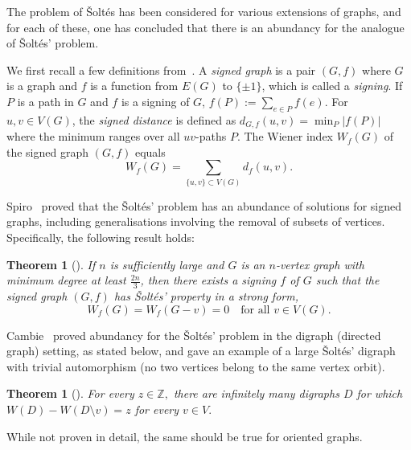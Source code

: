 \documentclass[a4paper,11pt]{article}
\newcommand*{\abs}[1]{\lvert #1\rvert}
\newtheorem{thm}[defi]{Theorem}
\begin{document}

    

    The problem of \v Solt\'es has been considered for various extensions of graphs, and for each of these, one has concluded that there is an abundancy for the analogue of \v Solt\'es' problem.

    We first recall a few definitions from~\cite{Spiro22}.
    A \emph{signed graph} is a pair \((G, f)\) where \(G\) is a graph and \(f\) is a function from \(E(G)\) to \(\{ \pm 1 \}\), which is called a \emph{signing}.
If \( P \) is a path in \( G \) and \(f \) is a signing of \( G \), 
\(
f(P) := \sum_{e \in P} f(e).
\)
For \( u, v \in V(G) \), the \emph{signed distance} is defined as
$
d_{G,f}(u,v) = \min_P \abs{f(P)}$
where the minimum ranges over all \( uv \)-paths \( P \).
The Wiener index \( W_f(G) \) of the signed graph \( (G, f) \) equals
\[
W_f(G) =  \sum_{\{u,v\} \subset V(G)} d_f(u,v).
\]

Spiro~\cite[Cor.~1.2]{Spiro22} proved that the \v Solt\'es' problem has an abundance of solutions for signed graphs, including generalisations involving the removal of subsets of vertices. Specifically, the following result holds: 
\begin{thm}[\cite{Spiro22}]
    If \( n \) is sufficiently large and \( G \) is an \( n \)-vertex graph with minimum degree at  
least \( \frac{2n}{3} \), then there exists a signing \( f \) of \( G \) such that the signed graph $(G, f)$ has \v Solt\'es' property in a strong form, \[
W_f(G) = W_f(G - v) = 0 \quad \text{for all } v \in V(G).
\]
\end{thm}

Cambie~\cite[Thm.~1]{Cambie25digraph} proved abundancy for the \v Solt\'es' problem in the digraph (directed graph) setting, as stated below, and gave an example of a large \v Solt\'es' digraph with trivial automorphism (no two vertices belong to the same vertex orbit).
\begin{thm}[\cite{Cambie25digraph}]
    For every $z \in \mathbb Z,$ there are infinitely many digraphs $D$ for which $W(D)-W(D \setminus v)=z$ for every $v \in V.$
\end{thm}
While not proven in detail, the same should be true for oriented graphs.
\end{document}
